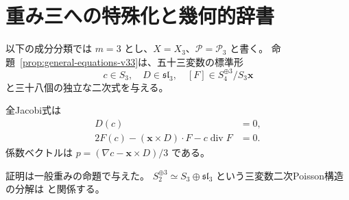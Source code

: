 \section{重み三への特殊化と幾何的辞書}
\label{sec:poisson-coordinates-v32}
以下の成分分類では $m=3$ とし、$X=X_3$、$\mathscr P=\mathscr P_3$ と書く。
命題~\ref{prop:general-equations-v33}は、五十三変数の標準形
\[
 c\in S_3,\quad D\in\mathfrak{sl}_3,\quad [F]\in S_4^{\oplus3}/S_3\mathbf x
\]
と三十八個の独立な二次式を与える。
\begin{proposition}[重み三の方程式]
\label{prop:weighted-poisson-equations-v31}
全Jacobi式は
\begin{align}
 D(c)&=0,\label{eq:weighted-base-jacobi-v31}\\
 2F(c)-(\mathbf x\times D)\cdot F-c\operatorname{div}F&=0.
 \label{eq:weighted-mixed-jacobi-v31}
\end{align}
係数ベクトルは $p=(\nabla c-\mathbf x\times D)/3$ である。
\end{proposition}
証明は一般重みの命題で与えた。
$S_2^{\oplus3}\simeq S_3\oplus\mathfrak{sl}_3$ という三変数二次Poisson構造の分解は
\cite{LiuXu1992,DoninMakarLimanov1998}と関係する。
